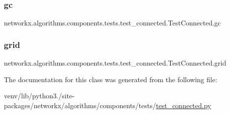 \subsubsection{\texorpdfstring{gc}{gc}}
{\footnotesize\ttfamily networkx.\+algorithms.\+components.\+tests.\+test\+\_\+connected.\+Test\+Connected.\+gc}

\mbox{\label{classnetworkx_1_1algorithms_1_1components_1_1tests_1_1test__connected_1_1TestConnected_a4da8533e963ac9ec636721be0f017926}} 
\subsubsection{\texorpdfstring{grid}{grid}}
{\footnotesize\ttfamily networkx.\+algorithms.\+components.\+tests.\+test\+\_\+connected.\+Test\+Connected.\+grid}



The documentation for this class was generated from the following file\+:\begin{DoxyCompactItemize}
\item 
venv/lib/python3./site-\/packages/networkx/algorithms/components/tests/\hyperlink{test__connected_8py}{test\+\_\+connected.\+py}\end{DoxyCompactItemize}
